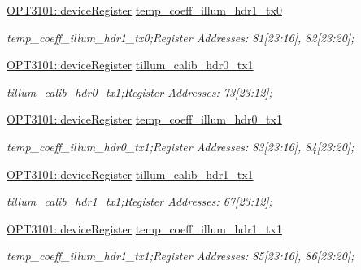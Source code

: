 \begin{DoxyCompactItemize}
\mbox{\hyperlink{class_o_p_t3101_1_1device_register}{O\+P\+T3101\+::device\+Register}} \mbox{\hyperlink{class_o_p_t3101_1_1registers_a587a6142ddb574def867aa9f545a8d9c}{temp\+\_\+coeff\+\_\+illum\+\_\+hdr1\+\_\+tx0}}
\begin{DoxyCompactList}\small\item\em temp\+\_\+coeff\+\_\+illum\+\_\+hdr1\+\_\+tx0;Register Addresses\+: 81\mbox{[}23\+:16\mbox{]}, 82\mbox{[}23\+:20\mbox{]}; \end{DoxyCompactList}\item 
\mbox{\hyperlink{class_o_p_t3101_1_1device_register}{O\+P\+T3101\+::device\+Register}} \mbox{\hyperlink{class_o_p_t3101_1_1registers_aaa41e9820a7a006305ef538a8e3ac657}{tillum\+\_\+calib\+\_\+hdr0\+\_\+tx1}}
\begin{DoxyCompactList}\small\item\em tillum\+\_\+calib\+\_\+hdr0\+\_\+tx1;Register Addresses\+: 73\mbox{[}23\+:12\mbox{]}; \end{DoxyCompactList}\item 
\mbox{\hyperlink{class_o_p_t3101_1_1device_register}{O\+P\+T3101\+::device\+Register}} \mbox{\hyperlink{class_o_p_t3101_1_1registers_aa8aaf83fcdf6038175fa7e43458b86b6}{temp\+\_\+coeff\+\_\+illum\+\_\+hdr0\+\_\+tx1}}
\begin{DoxyCompactList}\small\item\em temp\+\_\+coeff\+\_\+illum\+\_\+hdr0\+\_\+tx1;Register Addresses\+: 83\mbox{[}23\+:16\mbox{]}, 84\mbox{[}23\+:20\mbox{]}; \end{DoxyCompactList}\item 
\mbox{\hyperlink{class_o_p_t3101_1_1device_register}{O\+P\+T3101\+::device\+Register}} \mbox{\hyperlink{class_o_p_t3101_1_1registers_abe0e3301fc50b5584dbf6c420114f274}{tillum\+\_\+calib\+\_\+hdr1\+\_\+tx1}}
\begin{DoxyCompactList}\small\item\em tillum\+\_\+calib\+\_\+hdr1\+\_\+tx1;Register Addresses\+: 67\mbox{[}23\+:12\mbox{]}; \end{DoxyCompactList}\item 
\mbox{\hyperlink{class_o_p_t3101_1_1device_register}{O\+P\+T3101\+::device\+Register}} \mbox{\hyperlink{class_o_p_t3101_1_1registers_a4c2057d1c2f04ad96359441cdaaecf57}{temp\+\_\+coeff\+\_\+illum\+\_\+hdr1\+\_\+tx1}}
\begin{DoxyCompactList}\small\item\em temp\+\_\+coeff\+\_\+illum\+\_\+hdr1\+\_\+tx1;Register Addresses\+: 85\mbox{[}23\+:16\mbox{]}, 86\mbox{[}23\+:20\mbox{]}; \end{DoxyCompactList}\item 

\end{DoxyCompactItemize}
